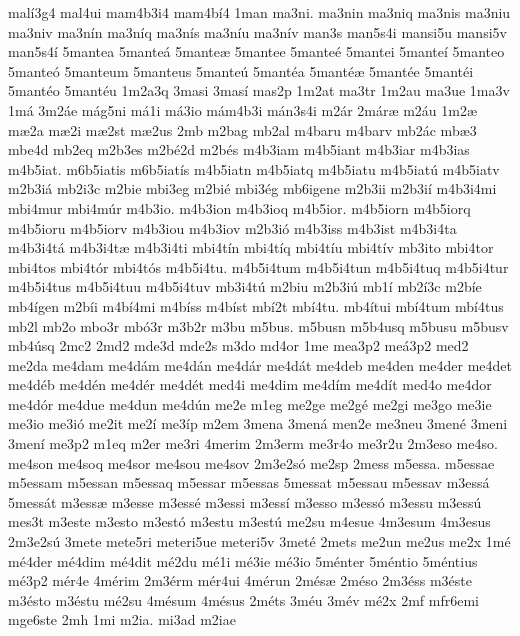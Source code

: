 {mal^^ed3g4
mal4ui
mam4b3i4
mam4b^^ed4
1man
ma3ni.
ma3nin
ma3niq
ma3nis
ma3niu
ma3niv
ma3n^^edn
ma3n^^edq
ma3n^^eds
ma3n^^edu
ma3n^^edv
man3s
man5s4i
mansi5u
mansi5v
man5s4^^ed
5mantea
5mante^^e1
5mante^^e6
5mantee
5mante^^e9
5mantei
5mante^^ed
5manteo
5mante^^f3
5manteum
5manteus
5mante^^fa
5mant^^e9a
5mant^^e9^^e6
5mant^^e9e
5mant^^e9i
5mant^^e9o
5mant^^e9u
1m2a3q
3masi
3mas^^ed
mas2p
1m2at
ma3tr
1m2au
ma3ue
1ma3v
1m^^e1
3m2^^e1e
m^^e1g5ni
m^^e11i
m^^e13io
m^^e1m4b3i
m^^e1n3s4i
m2^^e1r
2m^^e1r^^e6
m2^^e1u
1m2^^e6
m^^e62a
m^^e62i
m^^e62st
m^^e62us
2mb
m2bag
mb2al
m4baru
m4barv
mb2^^e1c
mb^^e63
mbe4d
mb2eq
m2b3es
m2b^^e92d
m2b^^e9s
m4b3iam
m4b5iant
m4b3iar
m4b3ias
m4b5iat.
m6b5iatis
m6b5iat^^eds
m4b5iatn
m4b5iatq
m4b5iatu
m4b5iat^^fa
m4b5iatv
m2b3i^^e1
mb2i3c
m2bie
mbi3eg
m2bi^^e9
mbi3^^e9g
mb6igene
m2b3ii
m2b3i^^ed
m4b3i4mi
mbi4mur
mbi4m^^far
m4b3io.
m4b3ion
m4b3ioq
m4b5ior.
m4b5iorn
m4b5iorq
m4b5ioru
m4b5iorv
m4b3iou
m4b3iov
m2b3i^^f3
m4b3iss
m4b3ist
m4b3i4ta
m4b3i4t^^e1
m4b3i4t^^e6
m4b3i4ti
mbi4t^^edn
mbi4t^^edq
mbi4t^^edu
mbi4t^^edv
mb3ito
mbi4tor
mbi4tos
mbi4t^^f3r
mbi4t^^f3s
m4b5i4tu.
m4b5i4tum
m4b5i4tun
m4b5i4tuq
m4b5i4tur
m4b5i4tus
m4b5i4tuu
m4b5i4tuv
mb3i4t^^fa
m2biu
m2b3i^^fa
mb1^^ed
mb2^^ed3c
m2b^^ede
mb4^^edgen
m2b^^edi
m4b^^ed4mi
m4b^^edss
m4b^^edst
mb^^ed2t
mb^^ed4tu.
mb4^^edtui
mb^^ed4tum
mb^^ed4tus
mb2l
mb2o
mbo3r
mb^^f33r
m3b2r
m3bu
m5bus.
m5busn
m5b4usq
m5busu
m5busv
mb4^^fasq
2mc2
2md2
mde3d
mde2s
m3do
md4or
1me
mea3p2
me^^e13p2
med2
me2da
me4dam
me4d^^e1m
me4d^^e1n
me4d^^e1r
me4d^^e1t
me4deb
me4den
me4der
me4det
me4d^^e9b
me4d^^e9n
me4d^^e9r
me4d^^e9t
med4i
me4dim
me4d^^edm
me4d^^edt
med4o
me4dor
me4d^^f3r
me4due
me4dun
me4d^^fan
me2e
m1eg
me2ge
me2g^^e9
me2gi
me3go
me3ie
me3io
me3i^^f3
me2it
me2^^ed
me3^^edp
m2em
3mena
3men^^e1
men2e
me3neu
3men^^e9
3meni
3men^^ed
me3p2
m1eq
m2er
me3ri
4merim
2m3erm
me3r4o
me3r2u
2m3eso
me4so.
me4son
me4soq
me4sor
me4sou
me4sov
2m3e2s^^f3
me2sp
2mess
m5essa.
m5essae
m5essam
m5essan
m5essaq
m5essar
m5essas
5messat
m5essau
m5essav
m3ess^^e1
5mess^^e1t
m3ess^^e6
m3esse
m3ess^^e9
m3essi
m3ess^^ed
m3esso
m3ess^^f3
m3essu
m3ess^^fa
mes3t
m3este
m3esto
m3est^^f3
m3estu
m3est^^fa
me2su
m4esue
4m3esum
4m3esus
2m3e2s^^fa
3mete
mete5ri
meteri5ue
meteri5v
3met^^e9
2mets
me2un
me2us
me2x
1m^^e9
m^^e94der
m^^e94dim
m^^e94dit
m^^e92du
m^^e91i
m^^e93ie
m^^e93io
5m^^e9nter
5m^^e9ntio
5m^^e9ntius
m^^e93p2
m^^e9r4e
4m^^e9rim
2m3^^e9rm
m^^e9r4ui
4m^^e9run
2m^^e9s^^e6
2m^^e9so
2m3^^e9ss
m3^^e9ste
m3^^e9sto
m3^^e9stu
m^^e92su
4m^^e9sum
4m^^e9sus
2m^^e9ts
3m^^e9u
3m^^e9v
m^^e92x
2mf
mfr6emi
mge6ste
2mh
1mi
m2ia.
mi3ad
m2iae
}
